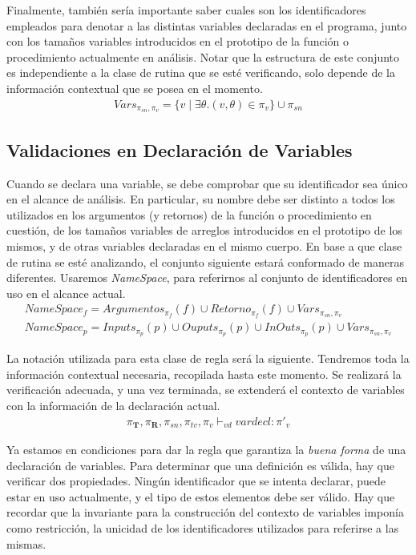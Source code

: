 \documentclass{article}
\begin{document}
Finalmente, también sería importante saber cuales son los identificadores empleados para denotar a las distintas variables declaradas en el programa, junto con los tamaños variables introducidos en el prototipo de la función o procedimiento actualmente en análisis.
Notar que la estructura de este conjunto es independiente a la clase de rutina que se esté verificando, solo depende de la información contextual que se posea en el momento. 
\begin{gather*}
Vars_{\pi_{sn}, \pi_{v}} = \{ v \mid \exists \theta. (v, \theta) \in \pi_{v} \} \cup \pi_{sn}
\end{gather*}

\subsection{Validaciones en Declaración de Variables}

Cuando se declara una variable, se debe comprobar que su identificador sea único en el alcance de análisis.
En particular, su nombre debe ser distinto a todos los utilizados en los argumentos (y retornos) de la función o procedimiento en cuestión, de los tamaños variables de arreglos introducidos en el prototipo de los mismos, y de otras variables declaradas en el mismo cuerpo.
En base a que clase de rutina se esté analizando, el conjunto siguiente estará conformado de maneras diferentes.
Usaremos \textit{NameSpace}, para referirnos al conjunto de identificadores en uso en el alcance actual.
\begin{gather*}
NameSpace_{f} =
Argumentos_{\pi_{f}}(f) \cup Retorno_{\pi_{f}}(f) \cup Vars_{\pi_{sn}, \pi_{v}}
\\
NameSpace_{p} =
Inputs_{\pi_{p}}(p) \cup Ouputs_{\pi_{p}}(p) \cup InOuts_{\pi_{p}}(p) \cup Vars_{\pi_{sn}, \pi_{v}}
\end{gather*}

La notación utilizada para esta clase de regla será la siguiente.
Tendremos toda la información contextual necesaria, recopilada hasta este momento.
Se realizará la verificación adecuada, y una vez terminada, se extenderá el contexto de variables con la información de la declaración actual.
\begin{gather*}
\pi_{\mathbf{T}}, \pi_{\mathbf{R}}, \pi_{sn}, \pi_{tv}, \pi_{v} \vdash_{vd} vardecl : \pi'_{v}
\end{gather*}

Ya estamos en condiciones para dar la regla que garantiza la \textit{buena forma} de una declaración de variables.
Para determinar que una definición es válida, hay que verificar dos propiedades.
Ningún identificador que se intenta declarar, puede estar en uso actualmente, y el tipo de estos elementos debe ser válido.
Hay que recordar que la invariante para la construcción del contexto de variables imponía como restricción, la unicidad de los identificadores utilizados para referirse a las mismas.
\end{document}
